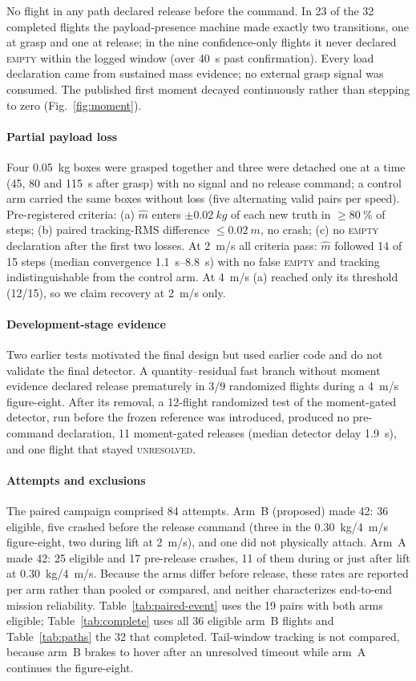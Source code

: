 No flight in any path declared release before the command. In 23 of the 32 completed flights
the payload-presence machine made exactly two transitions, one at grasp and one at release; in
the nine confidence-only flights it never declared \textsc{empty} within the logged window (over
\SI{40}{s} past confirmation). Every load declaration came from sustained mass evidence; no
external grasp signal was consumed. The published first moment decayed continuously rather than stepping to
zero (Fig.~\ref{fig:moment}).

\paragraph{Partial payload loss}
Four \SI{0.05}{kg} boxes were grasped together and three were detached one at a time (45, 80
and \SI{115}{s} after grasp) with no signal and no release command; a control arm carried the
same boxes without loss (five alternating valid pairs per speed). Pre-registered criteria: (a)
$\hat m$ enters $\pm\SI{0.02}{kg}$ of each new truth in $\ge\SI{80}{\percent}$ of steps; (b)
paired tracking-RMS difference $\le\SI{0.02}{m}$, no crash; (c) no \textsc{empty} declaration
after the first two losses. At \SI{2}{m/s} all criteria pass: $\hat m$ followed 14 of 15 steps (median convergence
\SIrange{1.1}{8.8}{s}) with no false \textsc{empty} and tracking indistinguishable from the
control arm. At \SI{4}{m/s} (a) reached only its threshold (12/15), so we claim recovery at
\SI{2}{m/s} only.

\paragraph{Development-stage evidence}
Two earlier tests motivated the final design but used earlier code and do not validate the final
detector. A quantity--residual fast branch without moment evidence declared release prematurely
in 3/9 randomized flights during a \SI{4}{m/s} figure-eight. After its removal, a 12-flight
randomized test of the moment-gated detector, run before the frozen reference was introduced,
produced no pre-command declaration, 11 moment-gated releases (median detector delay
\SI{1.9}{s}), and one flight that stayed \textsc{unresolved}.

\paragraph{Attempts and exclusions}
The paired campaign comprised 84 attempts. Arm~B (proposed) made 42: 36 eligible, five crashed
before the release command (three in the \SI{0.30}{kg}/\SI{4}{m/s} figure-eight, two during
lift at \SI{2}{m/s}), and one did not physically attach. Arm~A made 42: 25 eligible and 17
pre-release crashes, 11 of them during or just after lift at \SI{0.30}{kg}/\SI{4}{m/s}. Because the arms
differ before release, these rates are reported per arm rather than pooled or compared, and
neither characterizes end-to-end mission reliability. Table~\ref{tab:paired-event} uses the 19
pairs with both arms eligible; Table~\ref{tab:complete} uses all 36 eligible arm~B flights and
Table~\ref{tab:paths} the 32 that completed. Tail-window tracking is not compared, because arm~B brakes to hover
after an unresolved timeout while arm~A continues the figure-eight.
